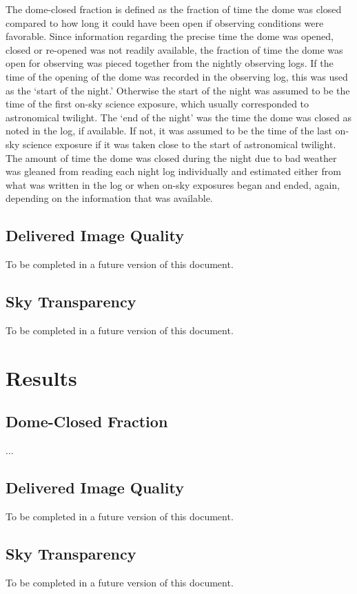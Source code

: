 \documentclass[12pt]{article}
\begin{document}
The dome-closed fraction is defined as the fraction of time the dome was closed compared to how long it could have been open if  observing conditions were favorable. Since information regarding the precise time the dome was opened, closed or re-opened was not readily available, the fraction of time the dome was open for observing was pieced together from the nightly observing logs. If the time of the opening of the dome was recorded in the observing log, this was used as the `start of the night.' Otherwise the start of the night was assumed to be the time of the first on-sky science exposure, which usually corresponded to astronomical twilight. The `end of the night' was the time the dome was closed as noted in the log, if available. If not, it was assumed to be the time of the last on-sky science exposure if it was taken close to the start of astronomical twilight. The amount of time the dome was closed during the night due to bad weather was gleaned from reading each night log individually and estimated either from what was written in the log or when on-sky exposures began and ended, again, depending on the information that was available. 

\subsection{Delivered Image Quality}

To be completed in a future version of this document.

\subsection{Sky Transparency}

To be completed in a future version of this document.

\section{Results}

\subsection{Dome-Closed Fraction}

...

\subsection{Delivered Image Quality}

To be completed in a future version of this document.

\subsection{Sky Transparency}

To be completed in a future version of this document.



\end{document}
